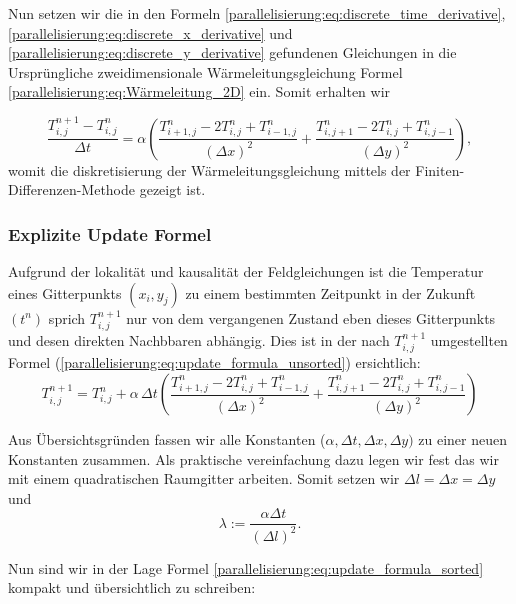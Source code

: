 Nun setzen wir die in den Formeln \ref{parallelisierung:eq:discrete_time_derivative},  \ref{parallelisierung:eq:discrete_x_derivative} und \ref{parallelisierung:eq:discrete_y_derivative} gefundenen Gleichungen in die Ursprüngliche zweidimensionale Wärmeleitungsgleichung Formel \ref{parallelisierung:eq:Wärmeleitung_2D} ein.
Somit erhalten wir 

\begin{equation}
	\label{parallelisierung:eq:update_formula_unsorted}
	\frac{T_{i,j}^{n+1} - T_{i,j}^n}{\Delta t}
	=
	\alpha \left(
	\frac{T_{i+1,j}^n - 2 T_{i,j}^n + T_{i-1,j}^n}{(\Delta x)^2}
	+
	\frac{T_{i,j+1}^n - 2 T_{i,j}^n + T_{i,j-1}^n}{(\Delta y)^2}
	\right),
\end{equation}
womit die diskretisierung der Wärmeleitungsgleichung mittels der Finiten-Differenzen-Methode gezeigt ist.

\subsubsection{Explizite Update Formel}
\label{parallelisierung:sec:update_formel}


Aufgrund der lokalität und kausalität der Feldgleichungen ist die Temperatur eines Gitterpunkts \( (x_i, y_j)\) zu einem bestimmten Zeitpunkt in der Zukunft \( (t^n)\) sprich \(T_{i,j}^{n+1}\) nur von dem  vergangenen Zustand eben dieses Gitterpunkts und desen direkten Nachbbaren abhängig.
Dies ist  in der nach \(T_{i,j}^{n+1}\) umgestellten Formel (\ref{parallelisierung:eq:update_formula_unsorted}) ersichtlich:
\begin{equation}
	\label{parallelisierung:eq:update_formula_sorted}
	T_{i,j}^{n+1}
	=
	T_{i,j}^n
	+
	\alpha \, \Delta t \left(
	\frac{T_{i+1,j}^n - 2 T_{i,j}^n + T_{i-1,j}^n}{(\Delta x)^2}
	+
	\frac{T_{i,j+1}^n - 2 T_{i,j}^n + T_{i,j-1}^n}{(\Delta y)^2}
	\right)
\end{equation}

Aus Übersichtsgründen fassen wir alle Konstanten (\(\alpha, \Delta t, \Delta x, \Delta y) \) zu einer neuen Konstanten zusammen.
Als praktische vereinfachung dazu legen wir fest das wir mit einem quadratischen Raumgitter arbeiten. Somit setzen wir  \(\Delta l = \Delta x = \Delta y\) und
\begin{equation}
	\label{parallelisierung:eq:lambda}
	\lambda 
	:= 
	\frac{\alpha \Delta t}{(\Delta l)^2}.
\end{equation}

Nun sind wir in der Lage Formel \ref{parallelisierung:eq:update_formula_sorted} kompakt und übersichtlich zu schreiben:

